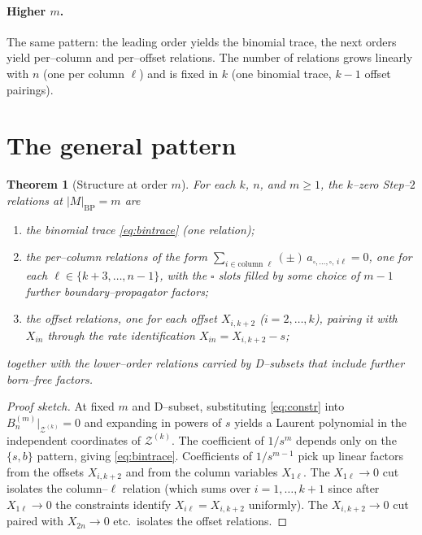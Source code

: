 \documentclass[11pt]{article}
\newtheorem{theorem}{Theorem}
\theoremstyle{definition}
\newcommand{\Z}{\mathcal{Z}}
\newcommand{\X}[1]{X_{#1}}
\begin{document}
\paragraph{Higher $m$.} The same pattern: the leading order yields the binomial trace, the next
orders yield per--column and per--offset relations. The number of relations grows linearly with $n$
(one per column $\ell$) and is fixed in $k$ (one binomial trace, $k-1$ offset pairings).

\section{The general pattern}
\begin{theorem}[Structure at order $m$]\label{thm:struct}
For each $k$, $n$, and $m\ge1$, the $k$--zero Step--$2$ relations at $|M|_{\mathrm{BP}}=m$ are
\begin{enumerate}[label=\textnormal{(\arabic*)},topsep=2pt,itemsep=1pt]
  \item \emph{the binomial trace} \eqref{eq:bintrace} (one relation);
  \item \emph{the per--column relations} of the form
  $\sum_{i\in\text{column }\ell}(\pm)\,a_{\square,\dots,\square,\,i\ell}=0$,
  one for each $\ell\in\{k{+}3,\dots,n{-}1\}$, with the $\square$ slots filled by some choice of
  $m-1$ further boundary--propagator factors;
  \item \emph{the offset relations}, one for each offset $\X{i,k+2}$ ($i=2,\dots,k$), pairing
  it with $\X{in}$ through the rate identification $\X{in}=\X{i,k+2}-s$;
\end{enumerate}
together with the lower--order relations carried by D--subsets that include further born--free
factors.
\end{theorem}
\begin{proof}[Proof sketch]
At fixed $m$ and D--subset, substituting \eqref{eq:constr} into $B_n^{(m)}|_{\Z^{(k)}}=0$ and
expanding in powers of $s$ yields a Laurent polynomial in the independent coordinates of
$\Z^{(k)}$. The coefficient of $1/s^m$ depends only on the $\{s,b\}$ pattern, giving
\eqref{eq:bintrace}. Coefficients of $1/s^{m-1}$ pick up linear factors from the offsets
$\X{i,k+2}$ and from the column variables $\X{1\ell}$. The $\X{1\ell}\!\to\!0$ cut isolates the
column--$\ell$ relation (which sums over $i=1,\dots,k{+}1$ since after $\X{1\ell}\!\to\!0$ the
constraints identify $\X{i\ell}=\X{i,k+2}$ uniformly). The $\X{i,k+2}\!\to\!0$ cut paired with
$\X{2n}\!\to\!0$ etc.\ isolates the offset relations.
\end{proof}
\end{document}
